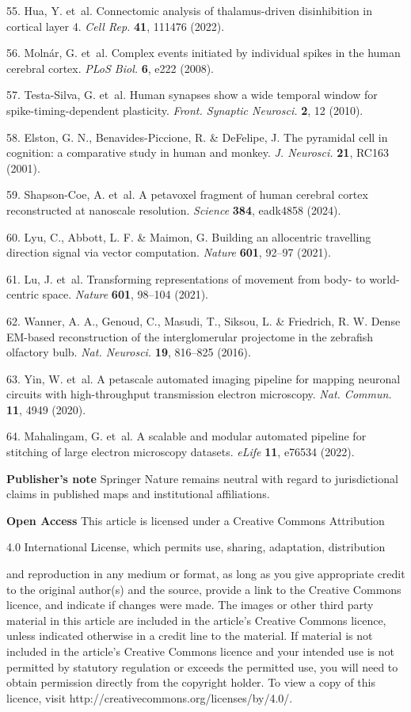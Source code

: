 \documentclass{article}
\begin{document}
\begin{hangpars}
55. Hua, Y. et~al. Connectomic analysis of thalamus-driven disinhibition in cortical layer 4. \emph{Cell Rep.} \textbf{41}, 111476 (2022). 

56. Molnár, G. et~al. Complex events initiated by individual spikes in the human cerebral cortex. \emph{PLoS Biol.} \textbf{6}, e222 (2008). 

57. Testa-Silva, G. et~al. Human synapses show a wide temporal window for spike-timing-dependent plasticity. \emph{Front. Synaptic Neurosci.} \textbf{2}, 12 (2010). 

58. Elston, G. N., Benavides-Piccione, R. \& DeFelipe, J. The pyramidal cell in cognition: a comparative study in human and monkey. \emph{J. Neurosci.} \textbf{21}, RC163 (2001). 

59. Shapson-Coe, A. et~al. A petavoxel fragment of human cerebral cortex reconstructed at nanoscale resolution. \emph{Science} \textbf{384}, eadk4858 (2024). 

60. Lyu, C., Abbott, L. F. \& Maimon, G. Building an allocentric travelling direction signal via vector computation. \emph{Nature} \textbf{601}, 92–97 (2021). 

61. Lu, J. et~al. Transforming representations of movement from body- to world-centric space. \emph{Nature} \textbf{601}, 98–104 (2021). 

62. Wanner, A. A., Genoud, C., Masudi, T., Siksou, L. \& Friedrich, R. W. Dense EM-based reconstruction of the interglomerular projectome in the zebrafish olfactory bulb. \emph{Nat. Neurosci.} \textbf{19}, 816–825 (2016). 

63. Yin, W. et~al. A petascale automated imaging pipeline for mapping neuronal circuits with high-throughput transmission electron microscopy. \emph{Nat. Commun.} \textbf{11}, 4949 (2020). 

64. Mahalingam, G. et~al. A scalable and modular automated pipeline for stitching of large electron microscopy datasets. \emph{eLife} \textbf{11}, e76534 (2022).
\end{hangpars}

\textbf{Publisher’s note }Springer Nature remains neutral with regard to jurisdictional claims in published maps and institutional affiliations.

\textbf{Open Access} This article is licensed under a Creative Commons Attribution

4.0 International License, which permits use, sharing, adaptation, distribution

and reproduction in any medium or format, as long as you give appropriate credit to the original author(s) and the source, provide a link to the Creative Commons licence, and indicate if changes were made. The images or other third party material in this article are included in the article’s Creative Commons licence, unless indicated otherwise in a credit line to the material. If material is not included in the article’s Creative Commons licence and your intended use is not permitted by statutory regulation or exceeds the permitted use, you will need to obtain permission directly from the copyright holder. To view a copy of this licence, visit http://creativecommons.org/licenses/by/4.0/.
\end{document}
